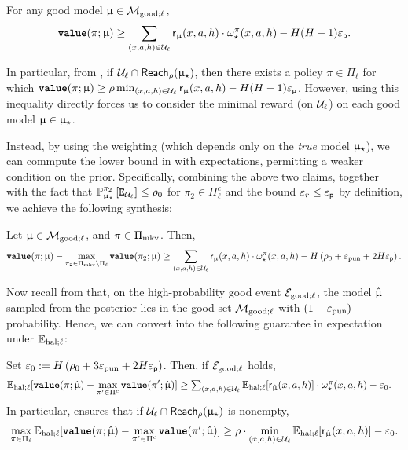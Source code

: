 \begin{claim} For any good model $\upmu \in \mathcal{M}_{\mathrm{good};\ell}$, \label{claim:value_lower_bound}
\begin{align*}
{\normalfont \texttt{\textbf{value}}}(\pi;\upmu)  \ge \sum_{(x,a,h) \in \mathcal{U}_{\ell}} \mathsf{r}_{\upmu}(x,a,h) \cdot \omega_{\star}^\pi(x,a,h) - H(H-1)\varepsilon_{\mathsf{p}}.
\end{align*}
\end{claim}
In particular, from , if $\mathcal{U}_{\ell} \cap \mathsf{Reach}_{\rho}(\upmu_{\star})$, then there exists a policy $\pi \in \Pi_{\ell}$ for which ${\normalfont \texttt{\textbf{value}}}(\pi;\upmu)   \ge \rho \min_{(x,a,h) \in \mathcal{U}_{\ell}}  \mathsf{r}_{\upmu}(x,a,h) - H(H-1)\varepsilon_{\mathsf{p}}$. However, using this inequality directly forces us to consider the minimal reward (on $\mathcal{U}_{\ell}$) on each good model $\upmu \in \upmu_{\star}$.

Instead, by using the weighting (which depends only on the \emph{true} model $\upmu_{\star}$), we can commpute the lower bound in  with expectations, permitting a weaker condition on the prior. Specifically, combining the above two claims, together with the fact that $\operatorname{\mathbb{P}}^{\pi_2}_{\upmu_{\star}}\left[ \texttt{E}_{\mathcal{U}_{\ell}} \right] \le \rho_0$ for $\pi_2 \in \Pi_{\ell}^c$ and the bound $\varepsilon_{r} \le \varepsilon_{\mathsf{p}}$ by definition, we achieve the following synthesis:
\begin{claim}\label{claim:value_diff} Let $\upmu \in \mathcal{M}_{\mathrm{good};\ell}$, and $\pi \in \Pi_{\mathrm{mkv}}$. Then,
\begin{align*}
{\normalfont \texttt{\textbf{value}}}(\pi;\upmu) - \max_{\pi_2 \in \Pi_{\mathrm{mkv}} \setminus \Pi_{\ell}}{\normalfont \texttt{\textbf{value}}}(\pi_2;\upmu)  \ge \sum_{(x,a,h) \in \mathcal{U}_{\ell}} \mathsf{r}_{\upmu}(x,a,h) \cdot \omega_{\star}^{\pi}(x,a,h) -H \left(\rho_0 + \varepsilon_{\mathrm{pun}}  + 2H\varepsilon_{\mathsf{p}}\right).
\end{align*}
\end{claim}
Now recall from  that, on the high-probability good event $\mathcal{E}_{\mathrm{good};\ell}$, the model $\hat{\upmu}$ sampled from the posterior lies in the good set $\mathcal{M}_{\mathrm{good};\ell}$ with $(1-\varepsilon_{\mathrm{pun}})$-probability. Hence, we can convert  into the following guarantee in expectation under $\mathbb{E}_{\mathrm{hal};\ell}$:
\begin{claim}\label{claim:value_diff_expectation}
Set $\varepsilon_0 :=  H \left(\rho_0 + 3\varepsilon_{\mathrm{pun}}  + 2H\varepsilon_{\mathsf{p}}\right)$.  Then, if $\mathcal{E}_{\mathrm{good};\ell}$ holds,
\begin{align*}
\mathbb{E}_{\mathrm{hal};\ell}[{\normalfont \texttt{\textbf{value}}}(\pi;\hat{\upmu}) - \max_{\pi' \in  \Pi^c} {\normalfont \texttt{\textbf{value}}}(\pi';\hat{\upmu}) ] &\ge \textstyle\sum_{(x,a,h) \in \mathcal{U}_{\ell}} \mathbb{E}_{\mathrm{hal};\ell}[\mathsf{r}_{\hat{\upmu}}(x,a,h)] \cdot \omega_{\star}^{\pi}(x,a,h)  - \varepsilon_0.
\end{align*}
In particular,  ensures that if $\mathcal{U}_{\ell} \cap \mathsf{Reach}_{\rho}(\upmu_{\star})$ is nonempty,
\begin{align}
\max_{\pi \in \Pi_{\ell}}\mathbb{E}_{\mathrm{hal};\ell}[{\normalfont \texttt{\textbf{value}}}(\pi;\hat{\upmu}) - \max_{\pi' \in  \Pi^c} {\normalfont \texttt{\textbf{value}}}(\pi';\hat{\upmu}) ]\ge  \rho \cdot\min_{(x,a,h) \in \mathcal{U}_{\ell}} \mathbb{E}_{\mathrm{hal};\ell}[\mathsf{r}_{\hat{\upmu}}(x,a,h)] -  \varepsilon_0.  \label{eq:RHS_value_diff_expecation}
\end{align}
\end{claim}

